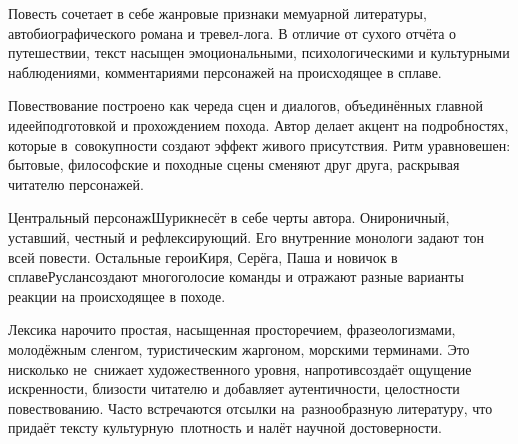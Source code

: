 \clearpage               

\thispagestyle{plain}   %
%
%

{\small%
	


Повесть сочетает в себе жанровые признаки мемуарной литературы, автобиографического романа и тревел-лога. В отличие от сухого отчёта о путешествии, текст насыщен эмоциональными, психологическими и культурными наблюдениями, комментариями персонажей на происходящее в сплаве. %


Повествование построено как череда сцен и диалогов, объединённых главной идеей\mdash подготовкой и прохождением похода. Автор делает акцент на подробностях, которые в~совокупности создают эффект живого присутствия. Ритм уравновешен: бытовые, философские и походные сцены сменяют друг друга, раскрывая читателю персонажей.


Центральный персонаж\mdash Шурик\mdash несёт в себе черты автора. Он\mdash ироничный, уставший, честный и рефлексирующий. Его внутренние монологи задают тон всей повести. Остальные герои\mdash Киря, Серёга, Паша и новичок в сплаве\mdash Руслан\mdash создают многоголосие команды и отражают разные варианты реакции на происходящее в походе.


Лексика нарочито простая, насыщенная просторечием, фразеологизмами, молодёжным сленгом, туристическим жаргоном, морскими терминами. Это нисколько не~снижает художественного уровня, напротив\mdash создаёт ощущение искренности, близости читателю и добавляет аутентичности, целостности повествованию. Часто встречаются отсылки на~разнообразную литературу, что придаёт тексту культурную~плотность и налёт научной достоверности.
	
}

